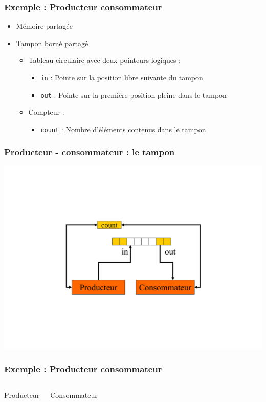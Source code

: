 \begin{frame}
\frametitle{Exemple : Producteur consommateur}
\begin{itemize}
\item Mémoire partagée
\item Tampon borné partagé
\begin{itemize}
\item Tableau circulaire avec deux pointeurs logiques :
\begin{itemize}
\item \texttt{in} : Pointe sur la position libre suivante du tampon
\item \texttt{out} : Pointe sur la première position pleine dans le tampon
\end{itemize}
\item Compteur :
\begin{itemize}
\item \texttt{count} : Nombre d’éléments contenus dans le tampon
\end{itemize}
\end{itemize}
\end{itemize}
\end{frame}

\begin{frame}
\frametitle{Producteur - consommateur : le tampon}
\includegraphics[width=.9\textwidth]{../illustration/prod_consom_tampon.pdf}
\end{frame}

\begin{frame}
\frametitle{Exemple : Producteur consommateur}
\begin{columns}
\begin{block}{Producteur}
\begin{scriptsize}\end{scriptsize}
\end{block}
\begin{block}{Consommateur}
\begin{scriptsize}

\end{scriptsize}
\end{block}
\end{columns}
\end{frame}

